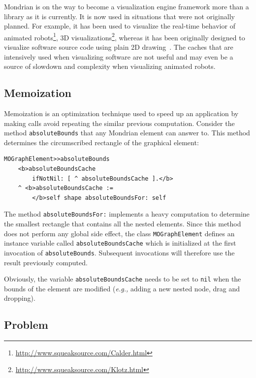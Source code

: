 \documentclass[preprint,10pt]{sigplanconf}
\newcommand{\ct}{\lstinline[backgroundcolor=\color{white},basicstyle=\footnotesize\ttfamily]}
\newcommand{\eg}{\emph{e.g.,}\xspace}
\begin{document}
Mondrian is on the way to become a visualization engine framework more than a library as it is currently. It is now used in situations that were not originally planned. For example, it has been used to visualize the real-time behavior of animated robots\footnote{\url{http://www.squeaksource.com/Calder.html}}, 3D visualizations\footnote{\url{http://www.squeaksource.com/Klotz.html}}, whereas it has been originally designed to visualize software source code using plain 2D drawing~\cite{Lanz03d}. The caches that are intensively used when visualizing software are not useful and may even be a source of slowdown and complexity when visualizing animated robots. 


\subsection{Memoization}

Memoization is an optimization technique used to speed up an application by making calls avoid repeating the similar previous computation. Consider the method \texttt{absoluteBounds} that any Mondrian element can answer to. This method determines the circumscribed rectangle of the graphical element:

\begin{lstlisting} 
MOGraphElement>>absoluteBounds
	<b>absoluteBoundsCache 
		ifNotNil: [ ^ absoluteBoundsCache ].</b>
	^ <b>absoluteBoundsCache := 
		</b>self shape absoluteBoundsFor: self
\end{lstlisting}

The method \ct{absoluteBoundsFor:} implements a heavy computation to determine the smallest rectangle that contains all the nested elements. Since this method does not perform any global side effect, the class \ct{MOGraphElement} defines an instance variable called \ct{absoluteBoundsCache} which is initialized at the first invocation of \ct{absoluteBounds}. Subsequent invocations will therefore use the result previously computed. 

Obviously, the variable \ct{absoluteBoundsCache} needs to be set to \ct{nil} when the bounds of the element are modified (\eg adding a new nested node, drag and dropping).


\subsection{Problem}
\end{document}
